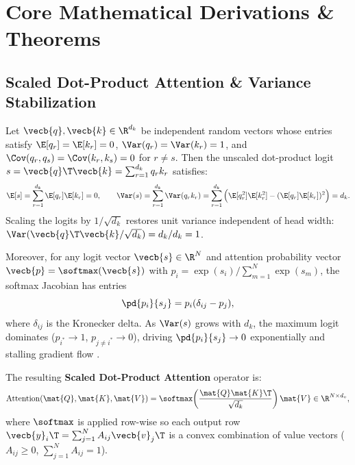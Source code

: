 \documentclass[../../../../master.tex]{subfiles}
\begin{document}
\section{Core Mathematical Derivations \& Theorems}
\label{sec:attn:derivations}

\subsection{Scaled Dot-Product Attention \& Variance Stabilization}

\begin{coremath}
Let $\vecb{q}, \vecb{k} \in \R^{d_k}$ be independent random vectors whose entries satisfy $\E[q_r] = \E[k_r] = 0$, $\Var(q_r) = \Var(k_r) = 1$, and $\Cov(q_r, q_s) = \Cov(k_r, k_s) = 0$ for $r \neq s$. Then the unscaled dot-product logit $s = \vecb{q}\T \vecb{k} = \sum_{r=1}^{d_k} q_r k_r$ satisfies:
\begin{equation}
  \E[s] = \sum_{r=1}^{d_k} \E[q_r]\E[k_r] = 0, \qquad
  \Var(s) = \sum_{r=1}^{d_k} \Var(q_r k_r) = \sum_{r=1}^{d_k} \Big(\E[q_r^2]\E[k_r^2] - (\E[q_r]\E[k_r])^2\Big) = d_k.
  \label{eq:attn:variance_proof}
\end{equation}
Scaling the logits by $1/\sqrt{d_k}$ restores unit variance independent of head width: $\Var(\vecb{q}\T \vecb{k} / \sqrt{d_k}) = d_k / d_k = 1$.

Moreover, for any logit vector $\vecb{s} \in \R^N$ and attention probability vector $\vecb{p} = \softmax(\vecb{s})$ with $p_i = \exp(s_i) / \sum_{m=1}^N \exp(s_m)$, the softmax Jacobian has entries
\begin{equation}
  \pd{p_i}{s_j} = p_i (\delta_{ij} - p_j),
  \label{eq:attn:softmax_jacobian}
\end{equation}
where $\delta_{ij}$ is the Kronecker delta. As $\Var(s)$ grows with $d_k$, the maximum logit dominates ($p_{i^*} \to 1$, $p_{j \neq i^*} \to 0$), driving $\pd{p_i}{s_j} \to 0$ exponentially and stalling gradient flow  .

The resulting \textbf{Scaled Dot-Product Attention} operator is:
\begin{equation}
  \mathrm{Attention}(\mat{Q}, \mat{K}, \mat{V}) = \softmax\!\left(\frac{\mat{Q}\mat{K}\T}{\sqrt{d_k}}\right)\mat{V} \in \R^{N \times d_v},
  \label{eq:attn:scaled_attn}
\end{equation}
where $\softmax$ is applied row-wise so each output row $\vecb{y}_i\T = \sum_{j=1}^N A_{ij} \vecb{v}_j\T$ is a convex combination of value vectors ($A_{ij} \ge 0$, $\sum_{j=1}^N A_{ij} = 1$).
\end{coremath}
\end{document}
